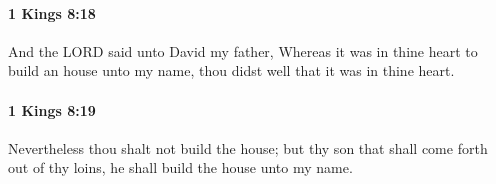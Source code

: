 		\paragraph{1 Kings 8:18} %
			\label{1KINGS-8-18}

			And the LORD said unto David my father, Whereas it was in thine heart to build an house unto my name, thou didst well that it was in thine heart.


		\paragraph{1 Kings 8:19} %
			\label{1KINGS-8-19}

			Nevertheless thou shalt not build the house; but thy son that shall come forth out of thy loins, he shall build the house unto my name.


